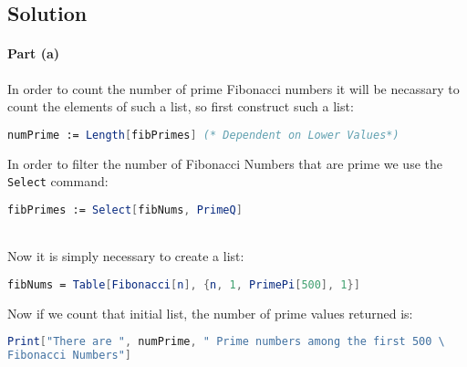 \documentclass[12pt]{article}
\begin{document}
\subsection{Solution}


\paragraph{Part (a)}  
  In order to count the number of prime Fibonacci numbers it will be necassary to count the elements of such a list, so first construct such a list:

  \begin{lstlisting}[language = Mathematica]
  numPrime := Length[fibPrimes] (* Dependent on Lower Values*)
  \end{lstlisting}	

  \hfill\begin{minipage}{\dimexpr\textwidth-3cm}
  In order to filter the number of Fibonacci Numbers that are prime we use the \verb|Select| command:

  \begin{lstlisting}[language = Mathematica]
  fibPrimes := Select[fibNums, PrimeQ] 
  \end{lstlisting}	

\hfill\begin{minipage}{\dimexpr\textwidth-3cm}

  \ \\Now it is simply necessary to create a list:

  \begin{lstlisting}[language = Mathematica]
  fibNums = Table[Fibonacci[n], {n, 1, PrimePi[500], 1}]
  \end{lstlisting}	
\end{minipage}

  \end{minipage}
  

  Now if we count that initial list, the number of prime values returned is:

    \begin{lstlisting}[language = Mathematica]
    Print["There are ", numPrime, " Prime numbers among the first 500 \
Fibonacci Numbers"]
    \end{lstlisting}	
\end{document}
